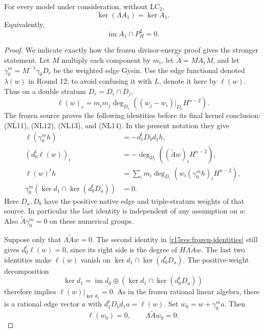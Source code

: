 \begin{lemma}
\label{r15res:compressed-kernel}
For every model under consideration, without $\mathrm{LC}_2$,
\[
              \boxed{\ \ker(\Lambda A_1)=\ker A_1.\ }
\tag{NR15.4}\label{r15res:kernel-compression}
\]
Equivalently,
\[
                       \operatorname{im}A_1\cap P_H^2=0.
\tag{NR15.5}\label{r15res:image-primitive-disjoint}
\]
\end{lemma}

\begin{proof}
We indicate exactly how the frozen divisor-energy proof gives
the stronger statement.  Let $M$ multiply each component by
$m_i$, let $\widetilde A=M A_1 M$, and let
$\gamma_0^m=M^{-1}\gamma_0D_c$ be the weighted edge Gysin.
Use the edge functional denoted $\lambda(w)$ in Round 12;
to avoid confusing it with $L$, denote it here by $\ell(w)$.
Thus on a double stratum $D_e=D_i\cap D_j$,
\[
       \ell(w)_e=m_im_j\deg_{D_e}((w_j-w_i)|_{D_e}H^{n-2}).
\tag{NR15.6}\label{r15res:edge-functional}
\]
The frozen source
proves the following identities before its final kernel
conclusion: (NL11), (NL12), (NL13), and (NL14).  In the present
notation they give
\[
 \begin{split}
 \ell(\gamma_0^m h)&=-d_1^tD_b d_1h,\\
 (d_0^t\ell(w))_i&=-\deg_{D_i}((\widetilde Aw)_iH^{n-2}),\\
 \ell(w)^th&=\sum_i m_i\deg_{D_i}
                            (w_i(\gamma_0^m h)_iH^{n-2}),\\
 \gamma_0^m(\ker d_1\cap\ker(d_0^tD_a))&=0.
 \end{split}
\tag{NR15.7}\label{r15res:frozen-identities}
\]
Here $D_a,D_b$ have the positive native edge and triple-stratum
weights of that source.  In particular the last identity is
independent of any assumption on $w$.  Also
$\widetilde A\gamma_0^m=0$ on these numerical groups.

Suppose only that $\Lambda\widetilde Aw=0$.
The second identity in \eqref{r15res:frozen-identities}
still gives $d_0^t\ell(w)=0$, since its right side is the
degree of $H\Lambda\widetilde Aw$.
The last two identities make $\ell(w)$ vanish on
$\ker d_1\cap\ker(d_0^tD_a)$.
The positive-weight decomposition
\[
 \ker d_1=\operatorname{im}d_0\oplus
                  (\ker d_1\cap\ker(d_0^tD_a))
\]
therefore implies $\ell(w)|_{\ker d_1}=0$.
As in the frozen rational linear algebra, there is a rational
edge vector $a$ with
$d_1^tD_b d_1a=\ell(w)$.
Set $w_0=w+\gamma_0^m a$.  Then
\[
               \ell(w_0)=0,
               \qquad\Lambda\widetilde Aw_0=0.
\tag{NR15.8}\label{r15res:adjusted-weak-kernel}
\]


\end{proof}
